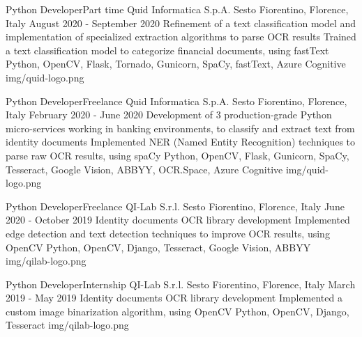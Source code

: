
\begin{cventries}

  \logocventry
    {Python Developer{\enskip\cdotp\enskip}Part time}
    {Quid Informatica S.p.A.}
    {Sesto Fiorentino, Florence, Italy}
    {August 2020 - September 2020}
    {
      \cvexp
        {Refinement of a text classification model and implementation of specialized extraction algorithms to parse OCR results}
        {Trained a text classification model to categorize financial documents, using fastText}
        {Python, OpenCV, Flask, Tornado, Gunicorn, SpaCy, fastText, Azure Cognitive}
    }
    {img/quid-logo.png}

  \logocventry
    {Python Developer{\enskip\cdotp\enskip}Freelance}
    {Quid Informatica S.p.A.}
    {Sesto Fiorentino, Florence, Italy}
    {February 2020 - June 2020}
    {
      \cvexp
        {Development of 3 production-grade Python micro-services working in banking environments, to classify and extract text from identity documents}
        {Implemented NER (Named Entity Recognition) techniques to parse raw OCR results, using spaCy}
        {Python, OpenCV, Flask, Gunicorn, SpaCy, Tesseract, Google Vision, ABBYY, OCR.Space, Azure Cognitive}
    }
    {img/quid-logo.png}

  \logocventry
    {Python Developer{\enskip\cdotp\enskip}Freelance}
    {QI-Lab S.r.l.}
    {Sesto Fiorentino, Florence, Italy}
    {June 2020 - October 2019}
    {
      \cvexp
        {Identity documents OCR library development}
        {Implemented edge detection and text detection techniques to improve OCR results, using OpenCV}
        {Python, OpenCV, Django, Tesseract, Google Vision, ABBYY}
    }
    {img/qilab-logo.png}
  
  \logocventry
    {Python Developer{\enskip\cdotp\enskip}Internship}
    {QI-Lab S.r.l.}
    {Sesto Fiorentino, Florence, Italy}
    {March 2019 - May 2019}
    {
      \cvexp
        {Identity documents OCR library development}
        {Implemented a custom image binarization algorithm, using OpenCV}
        {Python, OpenCV, Django, Tesseract}
    }
    {img/qilab-logo.png}


\end{cventries}
